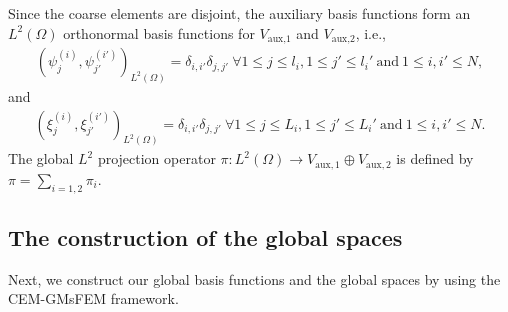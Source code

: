 \documentclass[preprint,12pt]{elsarticle}
\begin{document}
Since the coarse elements are disjoint, the auxiliary basis functions form an $L^2(\Omega)$ orthonormal basis functions for $V_{\text{aux,1}}$ and $V_{\text{aux,2}}$, i.e.,
\begin{equation}
    \begin{aligned}
        \left(\psi_j^{(i)},\psi_{j'}^{(i')}\right)_{L^2(\Omega)}=\delta_{i,i'}\delta_{j,j'}~\forall 1\leq j\leq l_i,1\leq j'\leq l_i' ~\text{and}~1\leq i,i'\leq N,
    \end{aligned}
\end{equation}
and
\begin{equation}
    \begin{aligned}
        \left(\xi_j^{(i)},\xi_{j'}^{(i')}\right)_{L^2(\Omega)}=\delta_{i,i'}\delta_{j,j'}~\forall 1\leq j\leq L_i,1\leq j'\leq L_i' ~\text{and}~1\leq i,i'\leq N.
    \end{aligned}
\end{equation}
The global $L^2$ projection operator $\pi:L^2(\Omega)\rightarrow{V_{\text{aux},1}\oplus V_{\text{aux},2}}$ is defined by $\pi=\sum_{i=1,2}\pi_{i}$.

\subsection{The construction of the global spaces}
Next, we construct our global basis functions and the global spaces by using the CEM-GMsFEM framework.
\end{document}
